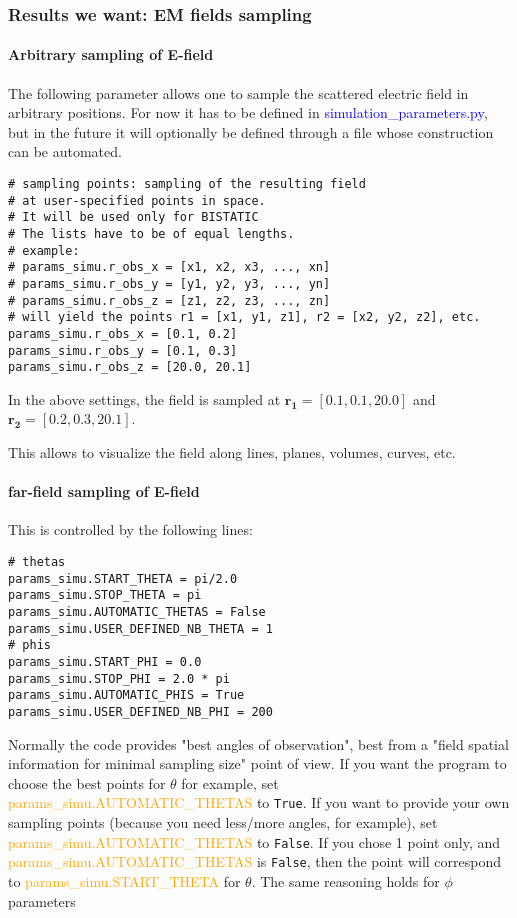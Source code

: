 \documentclass[a4paper,10pt]{book}
\newcommand{\file}[1] {\textcolor{blue}{\textsf{#1}}}
\newcommand{\parameter}[1] {\textcolor{orange}{\textsf{#1}}}
\begin{document}
\subsubsection{Results we want: EM fields sampling}

\paragraph{Arbitrary sampling of E-field}
%
\par
The following parameter allows one to sample the scattered electric field in arbitrary positions. For now it has to be defined in \file{simulation\_parameters.py}, but in the future it will optionally be defined through a file whose construction can be automated.
\begin{verbatim}
# sampling points: sampling of the resulting field 
# at user-specified points in space.
# It will be used only for BISTATIC
# The lists have to be of equal lengths.
# example:
# params_simu.r_obs_x = [x1, x2, x3, ..., xn]
# params_simu.r_obs_y = [y1, y2, y3, ..., yn]
# params_simu.r_obs_z = [z1, z2, z3, ..., zn]
# will yield the points r1 = [x1, y1, z1], r2 = [x2, y2, z2], etc.
params_simu.r_obs_x = [0.1, 0.2]
params_simu.r_obs_y = [0.1, 0.3]
params_simu.r_obs_z = [20.0, 20.1]
\end{verbatim}
In the above settings, the field is sampled at $\mathbf{r_1} = [0.1, 0.1, 20.0 ]$ and $\mathbf{r_2} = [0.2, 0.3, 20.1 ]$.
%
\par
This allows to visualize the field along lines, planes, volumes, curves, etc.

\paragraph{far-field sampling of E-field}
%
\par
This is controlled by the following lines:
\begin{verbatim}
# thetas
params_simu.START_THETA = pi/2.0
params_simu.STOP_THETA = pi
params_simu.AUTOMATIC_THETAS = False
params_simu.USER_DEFINED_NB_THETA = 1
# phis
params_simu.START_PHI = 0.0
params_simu.STOP_PHI = 2.0 * pi
params_simu.AUTOMATIC_PHIS = True
params_simu.USER_DEFINED_NB_PHI = 200
\end{verbatim}
%
\par
Normally the code provides "best angles of observation", best from a "field spatial information for minimal sampling size" point of view. If you want the program to choose the best points for $\theta$ for example, set \parameter{params\_simu.AUTOMATIC\_THETAS} to \texttt{True}. If you want to provide your own sampling points (because you need less/more angles, for example), set \parameter{params\_simu.AUTOMATIC\_THETAS} to \texttt{False}. If you chose 1 point only, and \parameter{params\_simu.AUTOMATIC\_THETAS} is \texttt{False}, then the point will correspond to \parameter{params\_simu.START\_THETA} for $\theta$. The same reasoning holds for $\phi$ parameters
\end{document}
